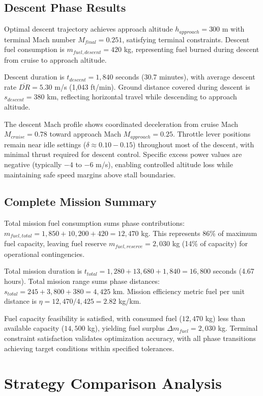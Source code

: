 \subsection{Descent Phase Results}

Optimal descent trajectory achieves approach altitude $h_{approach} = 300$ m with terminal Mach number $M_{final} = 0.251$, satisfying terminal constraints. Descent fuel consumption is $m_{fuel,descent} = 420$ kg, representing fuel burned during descent from cruise to approach altitude.

Descent duration is $t_{descent} = 1,840$ seconds (30.7 minutes), with average descent rate $\overline{DR} = 5.30$ m/s (1,043 ft/min). Ground distance covered during descent is $s_{descent} = 380$ km, reflecting horizontal travel while descending to approach altitude.

The descent Mach profile shows coordinated deceleration from cruise Mach $M_{cruise} = 0.78$ toward approach Mach $M_{approach} = 0.25$. Throttle lever positions remain near idle settings ($\delta \approx 0.10-0.15$) throughout most of the descent, with minimal thrust required for descent control. Specific excess power values are negative (typically $-4$ to $-6$ m/s), enabling controlled altitude loss while maintaining safe speed margins above stall boundaries.

\subsection{Complete Mission Summary}

Total mission fuel consumption sums phase contributions: $m_{fuel,total} = 1,850 + 10,200 + 420 = 12,470$ kg. This represents 86\% of maximum fuel capacity, leaving fuel reserve $m_{fuel,reserve} = 2,030$ kg (14\% of capacity) for operational contingencies.

Total mission duration is $t_{total} = 1,280 + 13,680 + 1,840 = 16,800$ seconds (4.67 hours). Total mission range sums phase distances: $s_{total} = 245 + 3,800 + 380 = 4,425$ km. Mission efficiency metric fuel per unit distance is $\eta = 12,470/4,425 = 2.82$ kg/km.

Fuel capacity feasibility is satisfied, with consumed fuel ($12,470$ kg) less than available capacity ($14,500$ kg), yielding fuel surplus $\Delta m_{fuel} = 2,030$ kg. Terminal constraint satisfaction validates optimization accuracy, with all phase transitions achieving target conditions within specified tolerances.

\section{Strategy Comparison Analysis}

